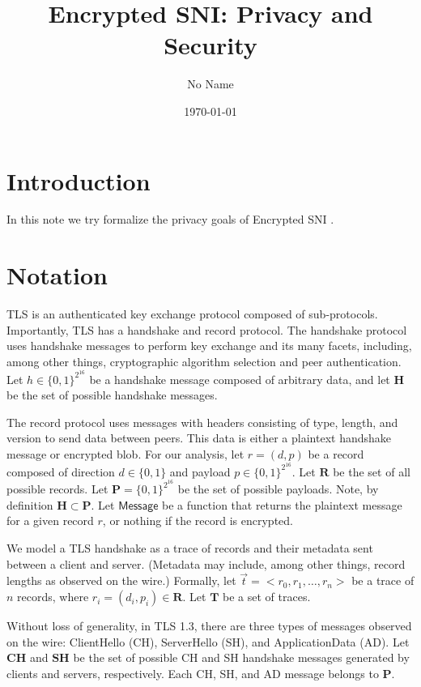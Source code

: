 \documentclass{article}
\title{Encrypted SNI: Privacy and Security}
\author{No Name}
\date{\today}
\theoremstyle{definition}
\begin{document}
\maketitle

\section{Introduction}

In this note we try formalize the privacy goals of Encrypted SNI \cite{ietf-tls-esni-04}.

\section{Notation}

TLS is an authenticated key exchange protocol composed of sub-protocols. Importantly, TLS has
a handshake and record protocol. The handshake protocol uses handshake messages to perform
key exchange and its many facets, including, among other things, cryptographic algorithm
selection and peer authentication. Let $h \in \{0,1\}^{2^{16}}$ be a handshake message 
composed of arbitrary data, and let $\mathbf{H}$ be the set of possible handshake messages.

The record protocol uses messages with headers consisting 
of type, length, and version to send data between peers. This data is either a plaintext 
handshake message or encrypted blob. For our analysis, let $r = (d, p)$ be a 
record composed of direction $d \in \{0,1\}$ and payload $p \in \{0,1\}^{2^{16}}$. Let
$\mathbf{R}$ be the set of all possible records. Let $\mathbf{P} = \{0,1\}^{2^{16}}$ 
be the set of possible payloads. Note, by definition $\mathbf{H} \subset \mathbf{P}$.
Let $\mathsf{Message}$ be a function that returns the plaintext message for a given
record $r$, or nothing if the record is encrypted.

We model a TLS handshake as a trace of records and their metadata sent between a client and server. 
(Metadata may include, among other things, record lengths as observed on the wire.) 
Formally, let $\vec{t} = <r_0, r_1, \dots, r_n>$ be a trace of $n$ records, where 
$r_i = (d_i, p_i) \in \mathbf{R}$. Let $\mathbf{T}$ be a set of traces. 

Without loss of generality, in TLS 1.3, there are three types of messages observed
on the wire: ClientHello (CH), ServerHello (SH), and ApplicationData (AD). Let $\mathbf{CH}$ 
and $\mathbf{SH}$ be the set of possible CH and SH handshake messages generated by 
clients and servers, respectively. Each CH, SH, and AD message belongs to $\mathbf{P}$.
\end{document}
